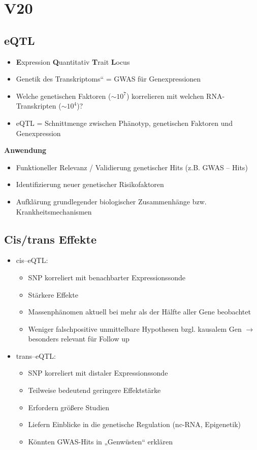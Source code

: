 \section{V20}
\subsection{eQTL}
\begin{itemize}
	\item \textbf{E}xpression \textbf{Q}uantitativ \textbf{T}rait \textbf{L}ocus
	\item Genetik des Transkriptoms“ = GWAS für Genexpressionen
	\item Welche genetischen Faktoren ($\sim 10^7$) korrelieren mit welchen RNA-Transkripten ($\sim 10^4$)?
	\item eQTL = Schnittmenge zwischen Phänotyp, genetischen Faktoren und Genexpression
\end{itemize}

\textbf{Anwendung}
\begin{itemize}
	\item Funktioneller Relevanz / Validierung genetischer Hits (z.B. GWAS – Hits)
	\item Identifizierung neuer genetischer Risikofaktoren
	\item Aufklärung grundlegender biologischer Zusammenhänge bzw. Krankheitsmechanismen
\end{itemize}

\subsection{Cis/trans Effekte}
\begin{itemize}
	\item cis–eQTL:
	\begin{itemize}
		\item SNP korreliert mit benachbarter Expressionssonde
		\item Stärkere Effekte
		\item Massenphänomen aktuell bei mehr als der Hälfte aller Gene beobachtet
		\item Weniger falschpositive unmittelbare Hypothesen bzgl. kausalem Gen $\rightarrow$ besonders relevant für Follow up
	\end{itemize}
	\item trans–eQTL:
	\begin{itemize}
		\item SNP korreliert mit distaler Expressionssonde
		\item Teilweise bedeutend geringere Effektstärke
		\item Erfordern größere Studien
		\item Liefern Einblicke in die genetische Regulation (nc-RNA, Epigenetik)
		\item Könnten GWAS-Hits in „Genwüsten“ erklären
	\end{itemize}
\end{itemize}

